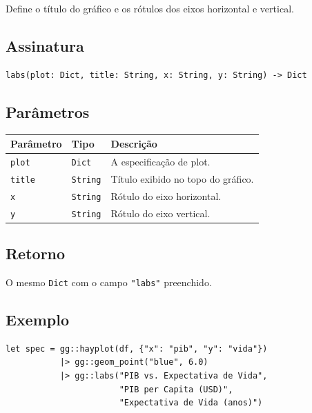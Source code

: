 \documentclass[12pt, a4paper, oneside]{book}
\newcommand{\code}[1]{\texttt{#1}}
\begin{document}
Define o título do gráfico e os rótulos dos eixos horizontal e vertical.

\subsection*{Assinatura}

\begin{lstlisting}[style=inline]
labs(plot: Dict, title: String, x: String, y: String) -> Dict
\end{lstlisting}

\subsection*{Parâmetros}

\begin{tabularx}{\textwidth}{@{}lL{2.5cm}X@{}}
  \toprule
  \textbf{Parâmetro} & \textbf{Tipo} & \textbf{Descrição} \\
  \midrule
  \code{plot}  & \code{Dict}   & A especificação de plot. \\[4pt]
  \code{title} & \code{String} & Título exibido no topo do gráfico. \\[4pt]
  \code{x}     & \code{String} & Rótulo do eixo horizontal. \\[4pt]
  \code{y}     & \code{String} & Rótulo do eixo vertical. \\
  \bottomrule
\end{tabularx}

\subsection*{Retorno}

O mesmo \code{Dict} com o campo \code{"labs"} preenchido.

\subsection*{Exemplo}

\begin{lstlisting}[caption={Definindo título e nomes dos eixos}]
let spec = gg::hayplot(df, {"x": "pib", "y": "vida"})
           |> gg::geom_point("blue", 6.0)
           |> gg::labs("PIB vs. Expectativa de Vida",
                       "PIB per Capita (USD)",
                       "Expectativa de Vida (anos)")
\end{lstlisting}

\end{document}
